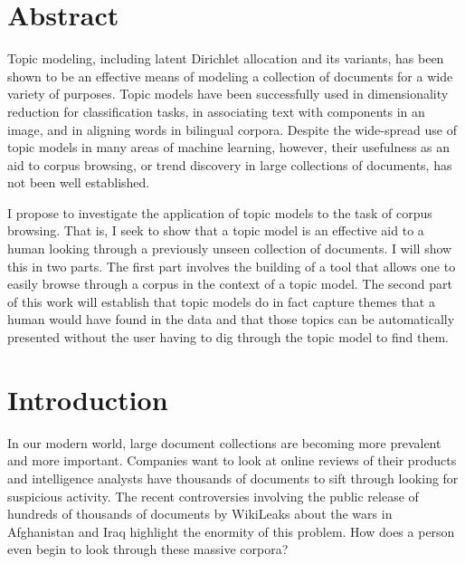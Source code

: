 \documentclass[ms]{byuprop}
\title{\Title}
\author{\Author}
\begin{document}
\maketitle



\section{Abstract}

Topic modeling, including latent Dirichlet allocation and its variants, has
been shown to be an effective means of modeling a collection of documents for a
wide variety of purposes.  Topic models have been successfully used in
dimensionality reduction for classification tasks, in associating text with
components in an image, and in aligning words in bilingual corpora.  Despite
the wide-spread use of topic models in many areas of machine learning, however,
their usefulness as an aid to corpus browsing, or trend discovery in large
collections of documents, has not been well established.

I propose to investigate the application of topic models to the task of corpus
browsing.  That is, I seek to show that a topic model is an effective aid to a
human looking through a previously unseen collection of documents.  I will show
this in two parts.  The first part involves the building of a tool that allows
one to easily browse through a corpus in the context of a topic model.  The
second part of this work will establish that topic models do in fact capture
themes that a human would have found in the data and that those topics can be
automatically presented without the user having to dig through the topic model
to find them.


\section{Introduction}

In our modern world, large document collections are becoming more prevalent and
more important.  Companies want to look at online reviews of their products and
intelligence analysts have thousands of documents to sift through looking for
suspicious activity.  The recent controversies involving the public release of
hundreds of thousands of documents by WikiLeaks about the wars in Afghanistan
and Iraq highlight the enormity of this problem.  How does a person even begin
to look through these massive corpora?
\end{document}

